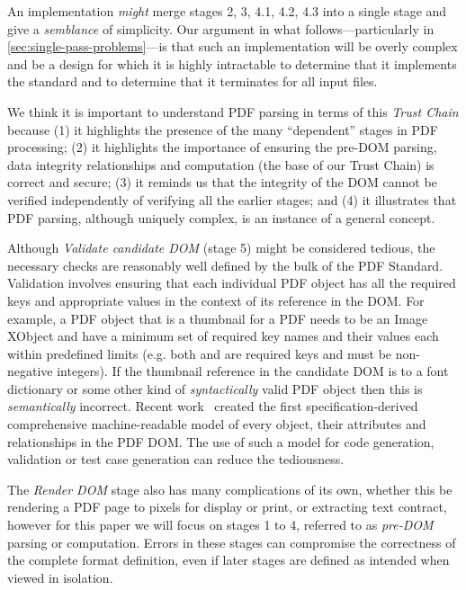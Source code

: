 An implementation \emph{might} merge stages 2, 3, 4.1, 4.2, 4.3 into
a single stage and give a \emph{semblance} of simplicity.
%
Our argument in what follows---particularly in
\cref{sec:single-pass-problems}---is
that such an implementation will be overly
complex and be a design for which it is highly intractable
to determine that it implements the standard
and to determine that it terminates for all input files.

We think it is important to understand PDF parsing in terms of this
\emph{Trust Chain} because
%
(1) it highlights the presence of the many ``dependent'' stages
in PDF processing;
%
(2) it highlights the importance of ensuring the pre-DOM parsing, data integrity relationships and
computation (the base of our Trust Chain) is correct and secure;
%
(3) it reminds us that the integrity of the DOM cannot be verified
independently of verifying all the earlier stages; and
%
(4) it illustrates that PDF parsing, although uniquely complex, is an instance of
a general concept.

Although \emph{Validate candidate DOM} (stage 5) might be considered tedious, the necessary checks are 
reasonably well defined by the bulk of the PDF Standard. Validation involves ensuring that each 
individual PDF object has all the required keys and appropriate values in the context of its reference in the DOM.
For example, a PDF object that is a thumbnail for a PDF needs to be an Image XObject and have a 
minimum set of required key names and their values each within predefined limits (e.g. both
 and  are required keys and must be non-negative integers). If the 
thumbnail reference in the candidate DOM is to a font dictionary or some other kind of
\emph{syntactically} valid PDF object then this is \emph{semantically} incorrect. Recent work~\cite{wyatt2021work} created the first specification-derived comprehensive
machine-readable model of every object, their attributes and relationships in the PDF DOM. The use
of such a model for code generation, validation or test case generation can reduce the tediousness.

The \emph{Render DOM} stage also has many complications of its own, whether this be rendering a PDF
page to pixels for display or print, or extracting text contract, however for this paper we will
focus on stages 1 to 4, referred to as \emph{pre-DOM} parsing or computation.
%
Errors in these stages can compromise the correctness of the complete format definition, even if later stages are defined as intended when viewed in isolation.